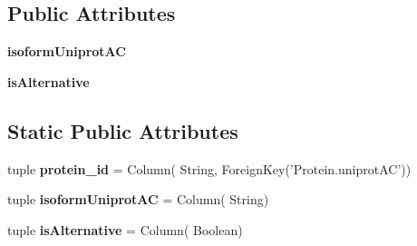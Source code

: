\subsection*{Public Attributes}
\begin{DoxyCompactItemize}
\item 
\hypertarget{classsrc_1_1fr_1_1tagc_1_1rainet_1_1core_1_1data_1_1ProteinIsoform_1_1ProteinIsoform_a27c797d513d0437fa83901b3e9735a10}{{\bfseries isoform\-Uniprot\-A\-C}}\label{classsrc_1_1fr_1_1tagc_1_1rainet_1_1core_1_1data_1_1ProteinIsoform_1_1ProteinIsoform_a27c797d513d0437fa83901b3e9735a10}

\item 
\hypertarget{classsrc_1_1fr_1_1tagc_1_1rainet_1_1core_1_1data_1_1ProteinIsoform_1_1ProteinIsoform_a574151ee0c90211556c354da6a3a4981}{{\bfseries is\-Alternative}}\label{classsrc_1_1fr_1_1tagc_1_1rainet_1_1core_1_1data_1_1ProteinIsoform_1_1ProteinIsoform_a574151ee0c90211556c354da6a3a4981}

\end{DoxyCompactItemize}
\subsection*{Static Public Attributes}
\begin{DoxyCompactItemize}
\item 
\hypertarget{classsrc_1_1fr_1_1tagc_1_1rainet_1_1core_1_1data_1_1ProteinIsoform_1_1ProteinIsoform_a3c5c385bf84087280faacfb003e9839a}{tuple {\bfseries protein\-\_\-id} = Column( String, Foreign\-Key('Protein.\-uniprot\-A\-C'))}\label{classsrc_1_1fr_1_1tagc_1_1rainet_1_1core_1_1data_1_1ProteinIsoform_1_1ProteinIsoform_a3c5c385bf84087280faacfb003e9839a}

\item 
\hypertarget{classsrc_1_1fr_1_1tagc_1_1rainet_1_1core_1_1data_1_1ProteinIsoform_1_1ProteinIsoform_a92cde86052887950dbe05a47c8eb0873}{tuple {\bfseries isoform\-Uniprot\-A\-C} = Column( String)}\label{classsrc_1_1fr_1_1tagc_1_1rainet_1_1core_1_1data_1_1ProteinIsoform_1_1ProteinIsoform_a92cde86052887950dbe05a47c8eb0873}

\item 
\hypertarget{classsrc_1_1fr_1_1tagc_1_1rainet_1_1core_1_1data_1_1ProteinIsoform_1_1ProteinIsoform_aa263aff6a9779da2aba36e227ee0ccdd}{tuple {\bfseries is\-Alternative} = Column( Boolean)}\label{classsrc_1_1fr_1_1tagc_1_1rainet_1_1core_1_1data_1_1ProteinIsoform_1_1ProteinIsoform_aa263aff6a9779da2aba36e227ee0ccdd}

\end{DoxyCompactItemize}


